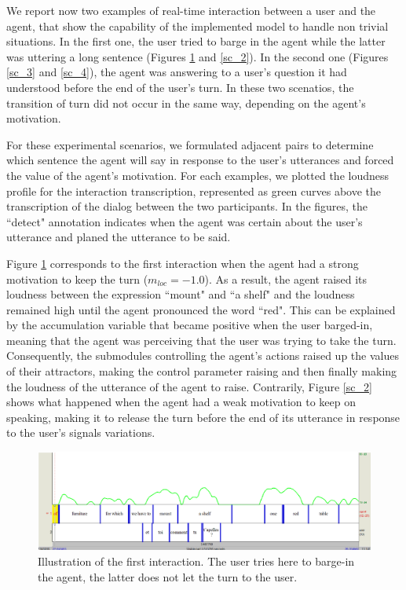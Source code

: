 We report now two examples of real-time interaction between a user and the agent, that show the capability of the implemented model to handle non trivial situations. In the first one, the user tried to barge in the agent while the latter was uttering a long sentence (Figures \ref{sc_1} and \ref{sc_2}). In the second one (Figures \ref{sc_3} and \ref{sc_4}), the agent was answering to a user's question it had understood before the end of the user's turn. In these two scenatios, the transition of turn did not occur in the same way, depending on the agent's motivation. 
 
For these experimental scenarios, we formulated adjacent pairs to determine which sentence the agent will say in response to the user's utterances and forced the value of the agent's motivation. 
For each examples, we plotted the loudness profile for the interaction transcription, represented as green curves above the transcription of the dialog between the two participants. In the figures, the ``detect" annotation indicates when the agent was certain about the user's utterance and planed the utterance to be said. 

Figure \ref{sc_1} corresponds to the first interaction when the agent had a strong motivation to keep the turn ($m_{loc}=-1.0$). 
As a result, the agent raised its loudness between the expression ``mount" and ``a shelf" and the loudness remained high until the agent pronounced the word ``red". This can be explained by the accumulation variable that became positive when the user barged-in, meaning that the agent was perceiving that the user was trying to take the turn. 
Consequently, the submodules controlling the agent's actions raised up the values of their attractors, making the control parameter raising and then finally making the loudness of the utterance of the agent to raise. 
Contrarily, Figure \ref{sc_2} shows what happened when the agent had a weak motivation to keep on speaking, making it to release the turn before the end of its utterance in response to the user's signals variations.

\begin{figure}
  \centering
  \includegraphics[width=\linewidth]{figure/volume_transcript_1_1.png}
  \caption{Illustration of the first interaction. The user tries here to barge-in the agent, the latter does not let the turn to the user.}
  \label{sc_1}
\end{figure}

